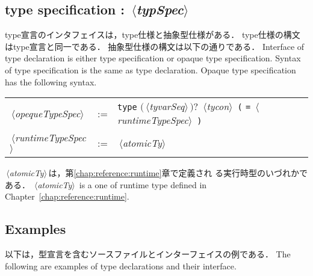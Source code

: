 \documentclass{jbook}
\newcommand{\txt}[2]{#2}
\newcommand{\nonterm}[1]{\mbox{$\,\langle$}{\it #1}\mbox{$\rangle\,$}}
\newcommand{\term}[1]{\mbox{{\tt #1}}}
\newcommand{\optional}[1]{\mbox{$($}{\protect #1}\mbox{$)?$}}
\begin{document}
\subsection{\txt{type仕様}{type specification} : \nonterm{typSpec}}
\ifjp%
	type宣言のインタフェイスは，type仕様と抽象型仕様がある．
	type仕様の構文はtype宣言と同一である．
	抽象型仕様の構文は以下の通りである．
\else%
	Interface of type declaration is either type specification or
opaque type specification.
	Syntax of type specification is the same as type declaration.
	Opaque type specification has the following syntax.
\fi%
\begin{center}
\begin{tabular}{lcll}
\nonterm{opequeTypeSpec}
  &:= & \term{type} \optional{\nonterm{tyvarSeq}} \nonterm{tycon} 
        \term{(} \term{=} \nonterm{runtimeTypeSpec} \term{)}\\
\nonterm{runtimeTypeSpec}
  &:= & \nonterm{atomicTy}
\end{tabular}
\end{center}
\ifjp%
	\nonterm{atomicTy}は，第\ref{chap:reference:runtime}章で定義され
る実行時型のいづれかである．
\else%
	\nonterm{atomicTy} is a one of runtime type defined in
Chapter~\ref{chap:reference:runtime}.
\fi%

\subsection{\txt{型宣言とインタフェイスの例}{Examples}}
\ifjp%
	以下は，型宣言を含むソースファイルとインターフェイスの例である．
\else%
	The following are examples of type declarations and their interface.
\fi%
\end{document}
